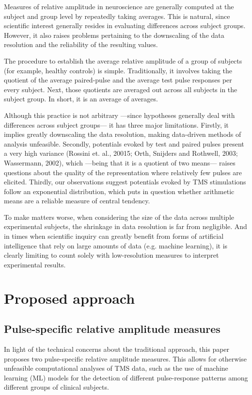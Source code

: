 \documentclass{article}
\begin{document}
\begin{multicols}{2}
Measures of relative amplitude in neuroscience are generally computed at the
subject and group level by repeatedly taking averages. This is natural, since
scientific interest generally resides in evaluating differences across subject
groups. However, it also raises problems pertaining to
the downscaling of the data resolution and the reliability of the resulting values.

The procedure to establish the average relative amplitude of a group of subjects
(for example, healthy controls) is simple. Traditionally, it involves taking the
quotient of the average paired-pulse and the average test pulse responses per
every subject. Next, those quotients are averaged out across all subjects in the
subject group. In short, it is an average of averages. 

Although this practice is not arbitrary ---since hypotheses generally deal with differences
across subject groups--- it has three major limitations. Firstly, it implies
greatly downscaling the data resolution, making data-driven methods of analysis
unfeasible. Secondly, potentials evoked by test and paired pulses present a very
high variance (Rossini et. al., 20015; Orth, Snijders and Rothwell, 2003;
Wassermann, 2002), which —being that it is a quotient of two means—  raises
questions about the quality of the representation where relatively few pulses
are elicited. Thirdly, our observations suggest potentials evoked by TMS
stimulations follow an exponential distribution, which puts in question whether
arithmetic means are a reliable measure of central tendency.

To make matters worse, when considering the size of the data across multiple
experimental subjects, the shrinkage in data resolution is far from negligible.
And in times when scientific inquiry can greatly benefit from forms of
artificial intelligence that rely on large amounts of data (e.g. machine
learning), it is clearly limiting to count solely with low-resolution measures
to interpret experimental results.


\section{Proposed approach}

\subsection{Pulse-specific relative amplitude measures}

In light of the technical concerns about the traditional approach, this paper
proposes two pulse-specific relative amplitude measures. This allows for
otherwise unfeasible computational analyses of TMS data, such as the use of
machine learning (ML) models for the detection of different pulse-response
patterns among different groups of clinical subjects.


\end{multicols}
\end{document}

